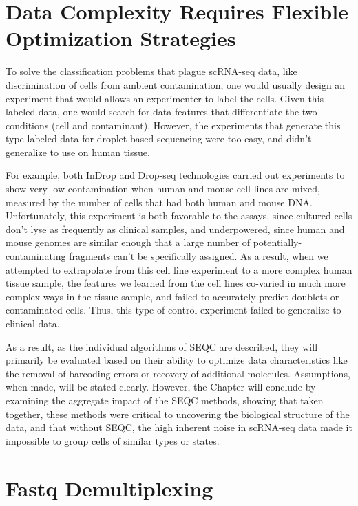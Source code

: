 \section{Data Complexity Requires Flexible Optimization Strategies}

To solve the classification problems that plague scRNA-seq data, like discrimination of cells from ambient contamination, one would usually design an experiment that would allows an experimenter to label the cells. 
Given this labeled data, one would search for data features that differentiate the two conditions (cell and contaminant). 
However, the experiments that generate this type labeled data for droplet-based sequencing were too easy, and didn't generalize to use on human tissue. 

For example, both InDrop and Drop-seq technologies carried out experiments to show very low contamination when human and mouse cell lines are mixed, measured by the number of cells that had both human and mouse DNA\@. 
Unfortunately, this experiment is both favorable to the assays, since cultured cells don't lyse as frequently as clinical samples, and underpowered, since human and mouse genomes are similar enough that a large number of potentially-contaminating fragments can't be specifically assigned.
As a result, when we attempted to extrapolate from this cell line experiment to a more complex human tissue sample, the features we learned from the cell lines co-varied in much more complex ways in the tissue sample, and failed to accurately predict doublets or contaminated cells. 
Thus, this type of control experiment failed to generalize to clinical data.

As a result, as the individual algorithms of SEQC are described, they will primarily be evaluated based on their ability to optimize data characteristics like the removal of barcoding errors or recovery of additional molecules. 
Assumptions, when made, will be stated clearly.
However, the Chapter will conclude by examining the aggregate impact of the SEQC methods, showing that taken together, these methods were critical to uncovering the biological structure of the data, and that without SEQC, the high inherent noise in scRNA-seq data made it impossible to group cells of similar types or states.  

\section{Fastq Demultiplexing}

